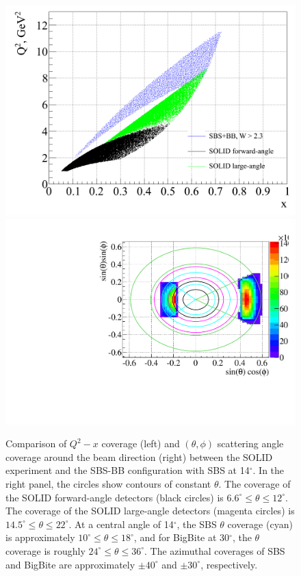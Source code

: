 \begin{figure}[h]
  \begin{center}
    \includegraphics[width=.48\textwidth]{figures/SBS_SOLID_phasecomp_W23.png}
    \includegraphics[width=.48\textwidth]{figures/SBS_SOLID_thetaphicomp.pdf}
  \end{center}
  \caption{\label{SBS_SOLID_phasespace_Comparison} Comparison of $Q^2-x$ coverage (left) and $(\theta,\phi)$ scattering angle coverage around the beam direction (right) between the SOLID experiment and the SBS-BB configuration with SBS at 14$^\circ$. In the right panel, the circles show contours of constant $\theta$. The coverage of the SOLID forward-angle detectors (black circles) is $6.6^\circ \le \theta \le 12^\circ$. The coverage of the SOLID large-angle detectors (magenta circles) is $14.5^\circ \le \theta \le 22^\circ$. At a central angle of 14$^\circ$, the SBS $\theta$ coverage (cyan) is approximately $10^\circ \le \theta \le 18^\circ$, and for BigBite at 30$^\circ$, the $\theta$ coverage is roughly $24^\circ \le \theta \le 36^\circ$. The azimuthal coverages of SBS and BigBite are approximately $\pm 40^\circ$ and $\pm 30^\circ$, respectively.}
\end{figure}
